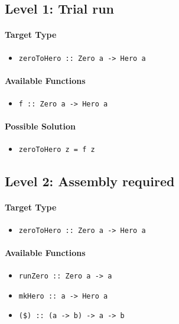 \documentclass[preprint,12pt]{elsarticle}
\begin{document}
\subsection{Level 1: Trial run}

\paragraph{Target Type } 
\begin{itemize}
    \item \texttt{zeroToHero :: Zero a -> Hero a}
\end{itemize}

\paragraph{Available Functions} 
\begin{itemize}
    \item \texttt{f :: Zero a -> Hero a}
\end{itemize}

\paragraph{Possible Solution} 
\begin{itemize}
    \item \texttt{zeroToHero z = f z}
\end{itemize}


\subsection{Level 2: Assembly required}

\paragraph{Target Type} 
\begin{itemize}
    \item \texttt{zeroToHero :: Zero a -> Hero a}
\end{itemize}

\paragraph{Available Functions} 
\begin{itemize}
    \item \texttt{runZero :: Zero a -> a}
    \item \texttt{mkHero :: a -> Hero a}
    \item \texttt{(\$) :: (a -> b) -> a -> b}
\end{itemize}
\end{document}
